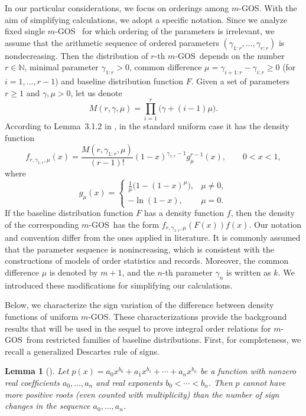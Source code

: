 \documentclass [11pt]{article}
\newtheorem{lemma}{Lemma}
\newcommand{\gos}{GOS}
\begin{document}
In our particular considerations, we focus on orderings among $m$-\gos. With the aim of simplifying calculations, we adopt a specific notation.
Since we analyze fixed single $m$-\gos\ 
for which ordering of the parameters is irrelevant, we assume that the
arithmetic sequence of ordered parameters $(\gamma_{1:r}, \ldots, \gamma_{r:r})$ is nondecreasing.
Then the distribution of $r$-th $m$-\gos\ depends on the number $r\in\mathbb{N}$, minimal parameter $\gamma_{1:r}>0$, common difference
$\mu=\gamma_{i+1:r}-\gamma_{i:r} \geq 0$ (for $i=1,\ldots,r-1$) and baseline distribution function $F$.
Given a set of parameters $r\geq 1$ and $\gamma,\mu>0$, let us denote
\begin{equation*}
\label{eq:Mprod}
M(r,\gamma,\mu)=\prod_{i=1}^r\bigl(\gamma+(i-1)\mu\bigr).
\end{equation*}
According to Lemma~3.1.2 in \cite{Kamps1995}, %
in the standard uniform case it has the density function
\begin{equation}
\label{2a}
f_{r,\gamma_{1:r},\mu}(x) = 
\frac{M(r,\gamma_{1:r},\mu)}{(r-1)!}
(1-x)^{\gamma_{1:r}-1} g^{r-1}_\mu(x), 
\qquad 0<x<1,
\end{equation}
where
\begin{equation}
\label{2b}
g_\mu(x) = \left\{
\begin{array}{ll}
\frac{1}{\mu} \bigl(1-(1-x)^\mu\bigr), & \mu\neq 0, \\[1.5ex]
-\ln(1-x), & \mu = 0.
\end{array}
\right.
\end{equation}
If the baseline distribution function $F$ has a density function $f$, then the density of the corresponding $m$-\gos\ has the form
$f_{r,\gamma_{1:r},\mu}(F(x))f(x)$.
Our notation and convention differ from the ones applied in literature.  It is commonly assumed that the parameter sequence is nonincreasing,
which is consistent with the constructions of models of order
statistics and records. 
Moreover, the common difference $\mu$ is denoted by $m+1$, and the $n$-th parameter $\gamma_n$ is written as $k$. We introduced these modifications for simplifying our calculations.

Below, we characterize the sign variation of the difference between density functions of uniform $m$-\gos.
%
These characterizations provide the background results that will be used in the sequel to prove integral order relations for $m$-\gos\ from restricted families of baseline distributions. 
%
First, for completeness, we recall a generalized Descartes rule of signs.
\begin{lemma}[\cite{Komornik2006}]
\label{gen-Descartes}
Let $p(x) = a_0x^{b_0} + a_1 x^{b_1} + \cdots + a_n x^{b_n}$ be a function with nonzero real coefﬁcients $a_0,\ldots,a_n$ and real exponents $b_0<\cdots< b_n$.
Then $p$ cannot have more positive roots (even counted with multiplicity) than the number of sign changes in the sequence $a_0,\ldots,a_n$.
\end{lemma}
\end{document}
